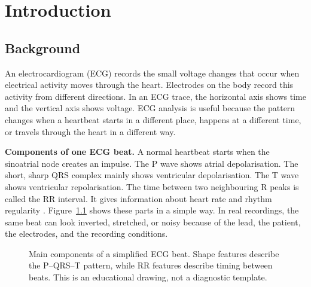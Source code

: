 \chapter{Introduction}\label{ch:introduction}

\section{Background}

An electrocardiogram (ECG) records the small voltage changes that occur when
electrical activity moves through the heart. Electrodes on the body record this
activity from different directions. In an ECG trace, the horizontal axis shows
time and the vertical axis shows voltage. ECG analysis is useful because the
pattern changes when a heartbeat starts in a different place, happens at a
different time, or travels through the heart in a different way.

\textbf{Components of one ECG beat.}
A normal heartbeat starts when the sinoatrial node creates an impulse. The
P wave shows atrial depolarisation. The short, sharp QRS complex mainly shows
ventricular depolarisation. The T wave shows ventricular repolarisation. The
time between two neighbouring R peaks is called the RR interval. It gives
information about heart rate and rhythm regularity
\cite{kligfield2007standardization}. Figure~\ref{fig:intro-ecg-anatomy} shows
these parts in a simple way. In real recordings, the same beat can look
inverted, stretched, or noisy because of the lead, the patient, the electrodes,
and the recording conditions.

\begin{figure}[H]
\centering
{}
\caption{Main components of a simplified ECG beat. Shape features describe the
P--QRS--T pattern, while RR features describe timing between beats. This is an
educational drawing, not a diagnostic template.}
\label{fig:intro-ecg-anatomy}
\end{figure}

